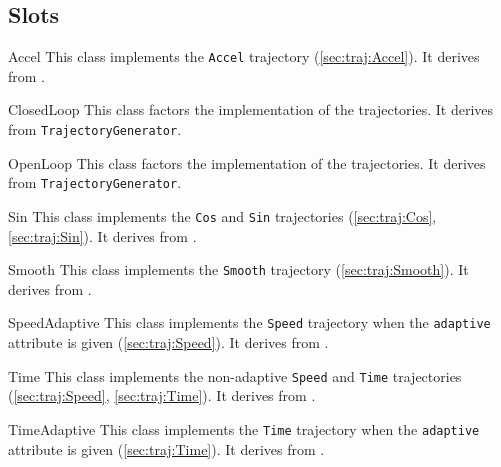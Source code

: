 \subsection{Slots}

\begin{urbiscriptapi}
\item[Accel] This class implements the \lstinline|Accel| trajectory
  (\autoref{sec:traj:Accel}).  It derives from
  .

\item[ClosedLoop] This class factors the implementation of the
   trajectories.  It derives from
  \lstinline|TrajectoryGenerator|.

\item[OpenLoop] This class factors the implementation of the 
  trajectories.  It derives from \lstinline|TrajectoryGenerator|.

\item[Sin] This class implements the \lstinline|Cos| and \lstinline|Sin|
  trajectories (\autoref{sec:traj:Cos}, \autoref{sec:traj:Sin}).  It derives
  from .

\item[Smooth] This class implements the \lstinline|Smooth| trajectory
  (\autoref{sec:traj:Smooth}).  It derives from
  .

\item[SpeedAdaptive] This class implements the \lstinline|Speed| trajectory
  when the \lstinline|adaptive| attribute is given
  (\autoref{sec:traj:Speed}).  It derives from
  .

\item[Time] This class implements the non-adaptive \lstinline|Speed| and
  \lstinline|Time| trajectories (\autoref{sec:traj:Speed},
  \autoref{sec:traj:Time}).  It derives from
  .

\item[TimeAdaptive] This class implements the \lstinline|Time| trajectory
  when the \lstinline|adaptive| attribute is given
  (\autoref{sec:traj:Time}).  It derives from .
\end{urbiscriptapi}

